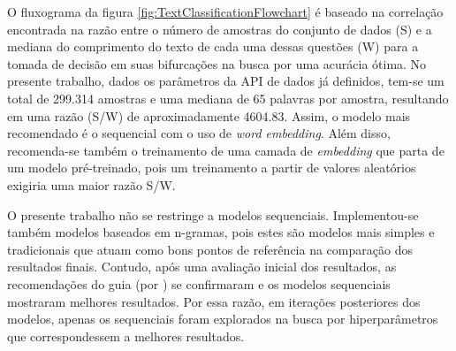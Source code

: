 O fluxograma da figura \ref{fig:TextClassificationFlowchart} é baseado na correlação encontrada na razão entre o número de amostras do conjunto de dados (S) e a mediana do comprimento do texto de cada uma dessas questões (W) para a tomada de decisão em suas bifurcações na busca por uma acurácia ótima. No presente trabalho, dados os parâmetros da API de dados já definidos, tem-se um total de 299.314 amostras e uma mediana de 65 palavras por amostra, resultando em uma razão (S/W) de aproximadamente 4604.83. Assim, o modelo mais recomendado é o sequencial com o uso de \textit{word embedding}. Além disso, recomenda-se também o treinamento de uma camada de \textit{embedding} que parta de um modelo pré-treinado, pois um treinamento a partir de valores aleatórios exigiria uma maior razão S/W.

O presente trabalho não se restringe a modelos sequenciais. Implementou-se também modelos baseados em n-gramas, pois estes são modelos mais simples e tradicionais que atuam como bons pontos de referência na comparação dos resultados finais. Contudo, após uma avaliação inicial dos resultados, as recomendações do guia (por \cite{Text_classification_guide}) se confirmaram e os modelos sequenciais mostraram melhores resultados. Por essa razão, em iterações posteriores dos modelos, apenas os sequenciais foram explorados na busca por hiperparâmetros que correspondessem a melhores resultados.